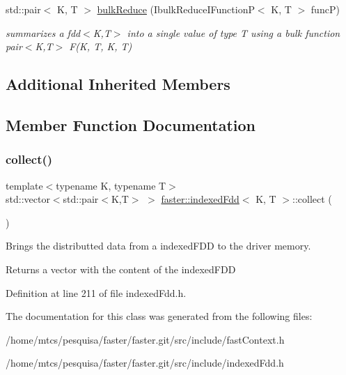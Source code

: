 \begin{DoxyCompactItemize}
std\+::pair$<$ K, T $>$ \hyperlink{group__bulk_gac3086716ca3ee4490d76cfb23bce1f62}{bulk\+Reduce} (Ibulk\+Reduce\+I\+FunctionP$<$ K, T $>$ funcP)
\begin{DoxyCompactList}\small\item\em summarizes a fdd$<$\+K,\+T$>$ into a single value of type T using a bulk function {\itshape pair$<$\+K,\+T$>$ F(\+K, T, K, T)} \end{DoxyCompactList}\end{DoxyCompactItemize}
\subsection*{Additional Inherited Members}


\subsection{Member Function Documentation}
\hypertarget{classfaster_1_1indexedFdd_ae8222d15d17bb139bf07435227010607}{}\label{classfaster_1_1indexedFdd_ae8222d15d17bb139bf07435227010607} 
\subsubsection{\texorpdfstring{collect()}{collect()}}
{\footnotesize\ttfamily template$<$typename K, typename T$>$ \\
std\+::vector$<$std\+::pair$<$K,T$>$ $>$ \hyperlink{classfaster_1_1indexedFdd}{faster\+::indexed\+Fdd}$<$ K, T $>$\+::collect (\begin{DoxyParamCaption}{ }\end{DoxyParamCaption})\hspace{0.3cm}{\ttfamily [inline]}}



Brings the distributted data from a indexed\+F\+DD to the driver memory. 

\begin{DoxyReturn}{Returns}
a vector with the content of the indexed\+F\+DD 
\end{DoxyReturn}


Definition at line 211 of file indexed\+Fdd.\+h.



The documentation for this class was generated from the following files\+:\begin{DoxyCompactItemize}
\item 
/home/mtcs/pesquisa/faster/faster.\+git/src/include/fast\+Context.\+h\item 
/home/mtcs/pesquisa/faster/faster.\+git/src/include/indexed\+Fdd.\+h\end{DoxyCompactItemize}
